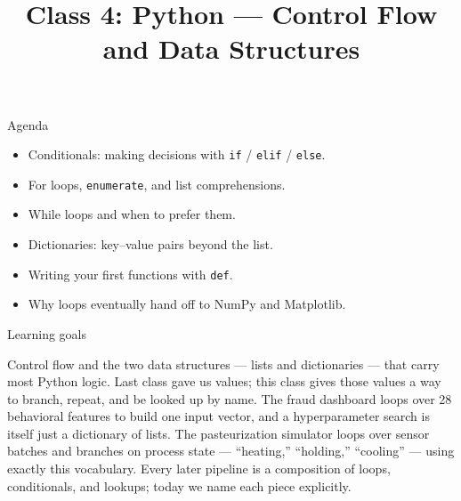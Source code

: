 

\title{Class 4: Python --- Control Flow and Data Structures}
\author{\coursename}
\date{}



\frame{\titlepage \coursefooter}

\begin{frame}{Agenda}
\begin{itemize}
\item Conditionals: making decisions with \texttt{if} / \texttt{elif} / \texttt{else}.
\item For loops, \texttt{enumerate}, and list comprehensions.
\item While loops and when to prefer them.
\item Dictionaries: key--value pairs beyond the list.
\item Writing your first functions with \texttt{def}.
\item Why loops eventually hand off to NumPy and Matplotlib.
\end{itemize}
\coursefooter
\end{frame}

\begin{frame}{Learning goals}
\coursefooter
\end{frame}

\coursecontextframe
{Control flow and the two data structures --- lists and dictionaries --- that carry most Python logic.}
{Last class gave us values; this class gives those values a way to branch, repeat, and be looked up by name.}
{The fraud dashboard loops over 28 behavioral features to build one input vector, and a hyperparameter search is itself just a dictionary of lists.}
{The pasteurization simulator loops over sensor batches and branches on process state --- ``heating,'' ``holding,'' ``cooling'' --- using exactly this vocabulary.}
{Every later pipeline is a composition of loops, conditionals, and lookups; today we name each piece explicitly.}

